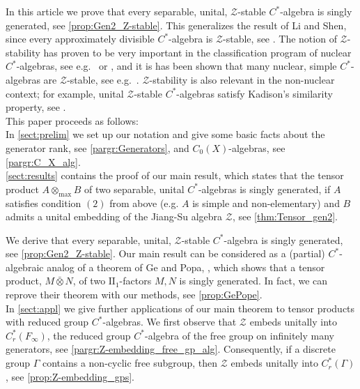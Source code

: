 \documentclass{amsart}
\theoremstyle{definition}
\begin{document}
    In this article we  prove that every separable, unital, $\mathcal{Z}$-stable {{$C^*$-al\-ge\-bra}}{} is singly generated, see \autoref{prop:Gen2_Z-stable}.
    This generalizes the result of Li and Shen, since every approximately divisible {{$C^*$-al\-ge\-bra}}{} is $\mathcal{Z}$-stable, see \cite[Theorem 2.3]{TomWin2008}.
    The notion of $\mathcal{Z}$-stability has proven to be very important in the classification program of nuclear {{$C^*$-al\-ge\-bra}}{s}, see e.g.\ \cite{Win2007arx} or \cite{EllTom2008}, and it is has been shown that many nuclear, simple {{$C^*$-al\-ge\-bra}}{s} are $\mathcal{Z}$-stable, see e.g.\ \cite{Win2010}. $\mathcal{Z}$-stability is also relevant in the non-nuclear context; for example, unital $\mathcal{Z}$-stable {{$C^*$-al\-ge\-bra}}{s} satisfy Kadison's similarity property, see \cite{JohWin2011}. \\

    This paper proceeds as follows:
    \\

    In \autoref{sect:prelim} we set up our notation and give some basic facts about the generator rank, see \ref{pargr:Generators}, and $C_{0}(X)$-algebras, see \ref{pargr:C_X_alg}.
    \\

    \autoref{sect:results} contains the proof of our main result, which states that the tensor product $A\otimes_{\text{max}} B$ of two separable, unital {{$C^*$-al\-ge\-bra}}{s} is singly generated, if $A$ satisfies condition $(2)$ from above (e.g. $A$ is simple and non-elementary) and $B$ admits a unital embedding of the Jiang-Su algebra $\mathcal{Z}$, see \autoref{thm:Tensor_gen2}.

    We derive that every separable, unital, $\mathcal{Z}$-stable {{$C^*$-al\-ge\-bra}}{} is singly generated, see \autoref{prop:Gen2_Z-stable}.
    Our main result can be considered as a (partial) $C^*$-algebraic analog of a theorem of Ge and Popa, \cite[Theorem 6.2]{GePop1998}, which shows that a tensor product, $M\bar{\otimes} N$, of two $\text{II}_1$-factors $M,N$ is singly generated.
    In fact, we can reprove their theorem with our methods, see \autoref{prop:GePope}.
    \\

    In \autoref{sect:appl} we give further applications of our main theorem to tensor products with reduced group {{$C^*$-al\-ge\-bra}}{s}.
    We first observe that $\mathcal{Z}$ embeds unitally into $C^*_r(F_\infty)$, the reduced group {{$C^*$-al\-ge\-bra}}{} of the free group on infinitely many generators, see \autoref{pargr:Z-embedding_free_gp_alg}.
    Consequently, if a discrete group $\Gamma$ contains a non-cyclic free subgroup, then $\mathcal{Z}$ embeds unitally into $C^*_r(\Gamma)$, see \autoref{prop:Z-embedding_gps}.
\end{document}
